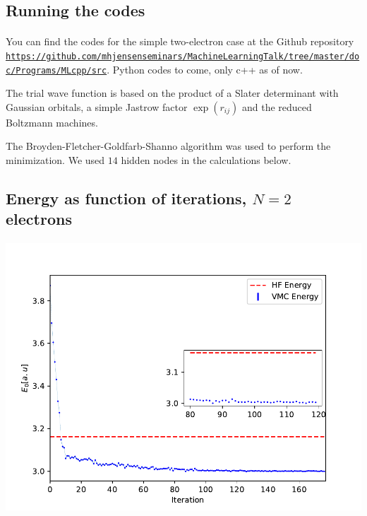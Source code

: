 \documentclass[%
oneside,                 %
final,                   %
10pt]{article}
\begin{document}
\subsection{Running the codes}

\paragraph{}
You can find the codes for the simple two-electron case at the Github repository \href{{https://github.com/mhjensenseminars/MachineLearningTalk/tree/master/doc/Programs/MLcpp/src}}{\nolinkurl{https://github.com/mhjensenseminars/MachineLearningTalk/tree/master/doc/Programs/MLcpp/src}}. Python codes to come, only c++ as of now. 

The trial wave function is based on the product of a Slater determinant with Gaussian orbitals, a simple Jastrow factor $\exp{(r_{ij})}$ and the reduced Boltzmann machines. 

The Broyden-Fletcher-Goldfarb-Shanno algorithm was used to perform the minimization. We used $14$ hidden nodes in the calculations below.






\subsection{Energy as function of iterations, $N=2$ electrons}

\paragraph{}


\vspace{6mm}

\centerline{\includegraphics[width=0.9\linewidth]{figures/figN2.pdf}}
\end{document}
